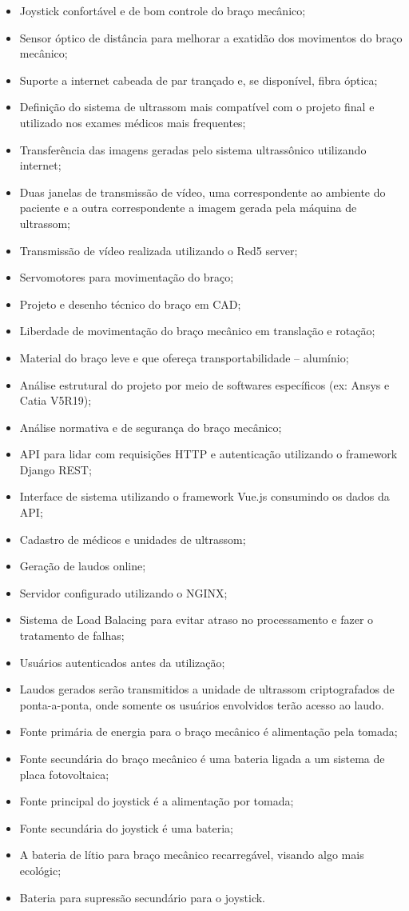\begin{itemize}
\item Joystick confortável e de bom controle do braço mecânico;
\item Sensor óptico de distância para melhorar a exatidão dos movimentos do braço mecânico;
\item Suporte a internet cabeada de par trançado e, se disponível, fibra óptica;
\item Definição do sistema de ultrassom mais compatível com o projeto final e utilizado nos exames médicos mais frequentes;
\item Transferência das imagens geradas pelo sistema ultrassônico utilizando internet;
\item Duas janelas de transmissão de vídeo, uma correspondente ao ambiente do paciente e a outra correspondente a imagem gerada pela máquina de ultrassom;
\item Transmissão de vídeo realizada utilizando o Red5 server;
\item Servomotores para movimentação do braço;
\item Projeto e desenho técnico do braço em CAD;
\item Liberdade de movimentação do braço mecânico em translação e rotação;
\item Material do braço leve e que ofereça transportabilidade – alumínio;
\item Análise estrutural do projeto por meio de softwares específicos (ex: Ansys e Catia V5R19);
\item Análise normativa e de segurança do braço mecânico;
\item API para lidar com requisições HTTP e autenticação utilizando o framework Django REST;
\item Interface de sistema utilizando o framework Vue.js consumindo os dados da API;
\item Cadastro de médicos e unidades de ultrassom;
\item Geração de laudos online;
\item Servidor configurado utilizando o NGINX;
\item Sistema de Load Balacing para evitar atraso no processamento e fazer o tratamento de falhas;
\item Usuários autenticados antes da utilização;
\item Laudos gerados serão transmitidos a unidade de ultrassom criptografados de ponta-a-ponta, onde somente os usuários envolvidos terão acesso ao laudo.
\item Fonte primária de energia para o braço mecânico é alimentação pela tomada;
\item Fonte secundária do braço mecânico é uma bateria ligada a um sistema de placa fotovoltaica;
\item Fonte principal do joystick é a alimentação por tomada;
\item Fonte secundária do joystick é uma bateria;
\item A bateria de lítio para braço mecânico recarregável, visando algo mais ecológic; 
\item Bateria para supressão secundário para o joystick.
\end{itemize}

